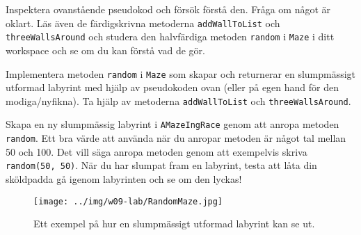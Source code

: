 \Subtask Inspektera ovanstående pseudokod och försök förstå den. Fråga om något är oklart. Läs även de färdigskrivna metoderna \texttt{addWallToList} och \texttt{threeWallsAround} och studera den halvfärdiga metoden \texttt{random} i \texttt{Maze} i ditt workspace och se om du kan förstå vad de gör.

\Subtask Implementera metoden \texttt{random} i \texttt{Maze} som skapar och returnerar en slumpmässigt utformad labyrint med hjälp av pseudokoden ovan (eller på egen hand för den modiga/nyfikna). Ta hjälp av metoderna \texttt{addWallToList} och \texttt{threeWallsAround}.

\Subtask Skapa en ny slumpmässig labyrint i \texttt{AMazeIngRace} genom att anropa metoden \texttt{random}. Ett bra värde att använda när du anropar metoden är något tal mellan 50 och 100. Det vill säga anropa metoden genom att exempelvis skriva \texttt{random(50, 50)}. När du har slumpat fram en labyrint, testa att låta din sköldpadda gå igenom labyrinten och se om den lyckas!

\begin{figure}[h]
	\begin{center}
		\texttt{[image: ../img/w09-lab/RandomMaze.jpg]}
	\end{center}
	\caption{Ett exempel på hur en slumpmässigt utformad labyrint kan se ut.}
\end{figure}

